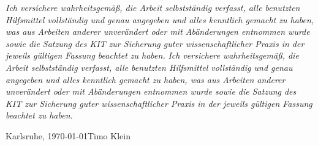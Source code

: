 \mbox{}\thispagestyle{empty}

\vspace*{1cm}

{\Large \textbf{}} 

\bigskip

{
\textit{Ich versichere wahrheitsgemäß, die Arbeit selbstständig verfasst, alle benutzten Hilfsmittel vollständig und genau angegeben und alles kenntlich gemacht zu haben, was aus Arbeiten anderer unverändert oder mit Abänderungen entnommen wurde sowie die Satzung des KIT zur Sicherung guter wissenschaftlicher Praxis in der jeweils gültigen Fassung beachtet zu haben.}}
{
\textit{Ich versichere wahrheitsgemäß, die Arbeit selbstständig verfasst, alle benutzten Hilfsmittel vollständig und genau angegeben und alles kenntlich gemacht zu haben, was aus Arbeiten anderer unverändert oder mit Abänderungen entnommen wurde sowie die Satzung des KIT zur Sicherung guter wissenschaftlicher Praxis in der jeweils gültigen Fassung beachtet zu haben.}}

\vspace{1cm}

%
%
%
%
Karlsruhe, \today \hfill Timo Klein

